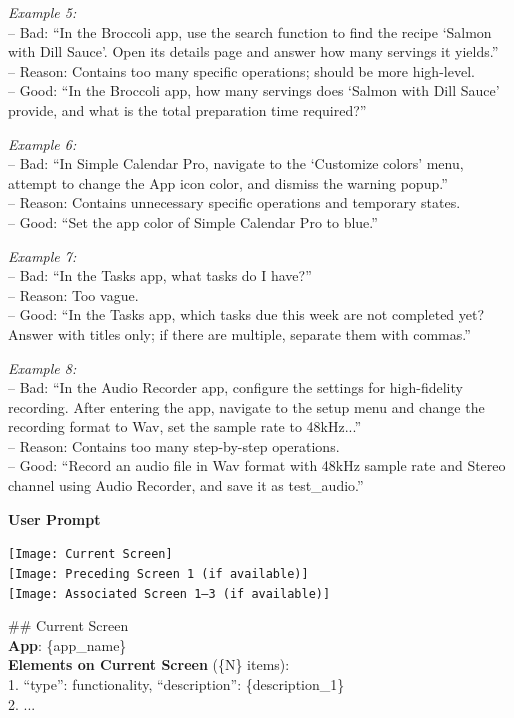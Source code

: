 \documentclass{article} %
\begin{document}
\begin{tcolorbox}[title=Prompt for Task Instruction Synthesis, colback=gray!5, colframe=gray!50, fonttitle=\bfseries\small, fontupper=\small, fontlower=\small, breakable]
\textit{Example 5:}\\
-- Bad: ``In the Broccoli app, use the search function to find the recipe `Salmon with Dill Sauce'. Open its details page and answer how many servings it yields.''\\
-- Reason: Contains too many specific operations; should be more high-level.\\
-- Good: ``In the Broccoli app, how many servings does `Salmon with Dill Sauce' provide, and what is the total preparation time required?''

\textit{Example 6:}\\
-- Bad: ``In Simple Calendar Pro, navigate to the `Customize colors' menu, attempt to change the App icon color, and dismiss the warning popup.''\\
-- Reason: Contains unnecessary specific operations and temporary states.\\
-- Good: ``Set the app color of Simple Calendar Pro to blue.''

\textit{Example 7:}\\
-- Bad: ``In the Tasks app, what tasks do I have?''\\
-- Reason: Too vague.\\
-- Good: ``In the Tasks app, which tasks due this week are not completed yet? Answer with titles only; if there are multiple, separate them with commas.''

\textit{Example 8:}\\
-- Bad: ``In the Audio Recorder app, configure the settings for high-fidelity recording. After entering the app, navigate to the setup menu and change the recording format to Wav, set the sample rate to 48kHz...''\\
-- Reason: Contains too many step-by-step operations.\\
-- Good: ``Record an audio file in Wav format with 48kHz sample rate and Stereo channel using Audio Recorder, and save it as test\_audio.''

\tcblower

\textbf{User Prompt}
\vspace{0.3em}

\texttt{[Image: Current Screen]}\\
\texttt{[Image: Preceding Screen 1 (if available)]}\\
\texttt{[Image: Associated Screen 1--3 (if available)]}

\#\# Current Screen\\
\textbf{App}: \{app\_name\}\\
\textbf{Elements on Current Screen} (\{N\} items):\\
\hspace{1em}1. ``type'': functionality, ``description'': \{description\_1\}\\
\hspace{1em}2. ...


\end{tcolorbox}
\end{document}
